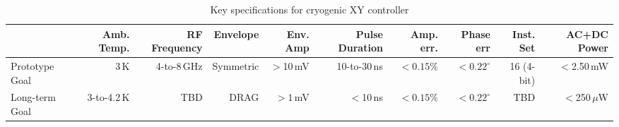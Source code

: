 \documentclass[journal]{IEEEtran}
\newcommand{\CR}[1]{{\color{black}#1}}
\begin{document}
\begin{table}
\begin{center}
\caption{Key specifications for cryogenic XY controller}\label{perfspecs}
\begin{tabular}{lrrrrrrrrr}
\toprule
&Amb. Temp.&RF Frequency&Envelope&Env. Amp&Pulse Duration&Amp. err.&Phase err&Inst. Set&AC+DC Power\\
\midrule
Prototype Goal&\CR{3}\,K&4-to-8\,GHz&Symmetric&$>$10\,mV&10-to-30\,ns&$<0.15\%$ &\CR{$<0.22^\circ$}&16 (4-bit)&$<$2.50\,mW\\
Long-term Goal&\CR{3-to-4.2\,K}&TBD&DRAG&$>1\,$mV&$<$10\,ns&$<0.15\%$&\CR{$<0.22^\circ$}&TBD&$<$250\,$\mu$W\\
\bottomrule
\end{tabular}
\end{center}
\end{table}
\end{document}
